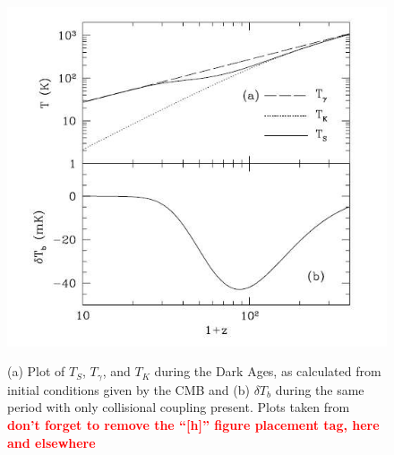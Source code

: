 \documentclass[12pt,a4paper]{report}
\newcommand{\attention}[1]{\textcolor{red}{\bf {#1}}}
\begin{document}
	\begin{figure}[htb!]
		\begin{center}
			\includegraphics[width=0.7\linewidth]{Figures/DA.png}\\
			\caption{(a) Plot of $T_S$, $T_\gamma$, and $T_K$ during the Dark Ages, as calculated from initial conditions given by the CMB and (b) $\delta$$T_b$ during the same period with only collisional coupling present. Plots taken from~\citep{2006PhR...433..181F} \attention{don't forget to remove the ``[h]'' figure placement tag, here and elsewhere}} 
			\label{Fig:DA}
		\end{center}
	\end{figure}
%	
%
%
\end{document}
